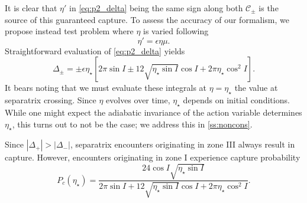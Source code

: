 \documentclass[
        fleqn,
        usenatbib,
    ]{mnras}
\newcommand*{\abs}[1]{\left|#1\right|}
\newcommand*{\s}[1]{\left[#1\right]}
\begin{document}
It is clear that $\eta'$ in \autoref{eq:p2_delta} being the same sign along both
$\mathcal{C}_{\pm}$ is the source of this guaranteed capture. To assess the
accuracy of our formalism, we propose instead test problem where $\eta$ is
varied following
\begin{equation}
    \eta' = \epsilon \eta \mu.
\end{equation}
Straightforward evaluation of \autoref{eq:p2_delta} yields
\begin{equation}
    \Delta_{\pm} = \pm \epsilon \eta_\star \s{
        2\pi \sin I \pm 12 \sqrt{\eta_\star \sin I}\cos I
            + 2\pi \eta_\star \cos^2 I}.
\end{equation}
It bears noting that we must evaluate these integrals at $\eta = \eta_\star$ the
value at separatrix crossing. Since $\eta$ evolves over time, $\eta_{\star}$
depends on initial conditions. While one might expect the adiabatic invariance
of the action variable determines $\eta_\star$, this turns out to not be the
case; we address this in \autoref{ss:noncons}.

Since $\abs{\Delta_+} > \abs{\Delta_-}$, separatrix encounters originating in
zone III always result in capture. However, encounters originating in zone I
experience capture probability
\begin{equation}
    P_c(\eta_\star) = \frac{24\cos I \sqrt{\eta_\star \sin I}}{
        2\pi \sin I + 12\sqrt{\eta_\star \sin I}\cos I
            + 2\pi \eta_\star \cos^2 I}.\label{eq:p_c_p2}
\end{equation}
\end{document}
